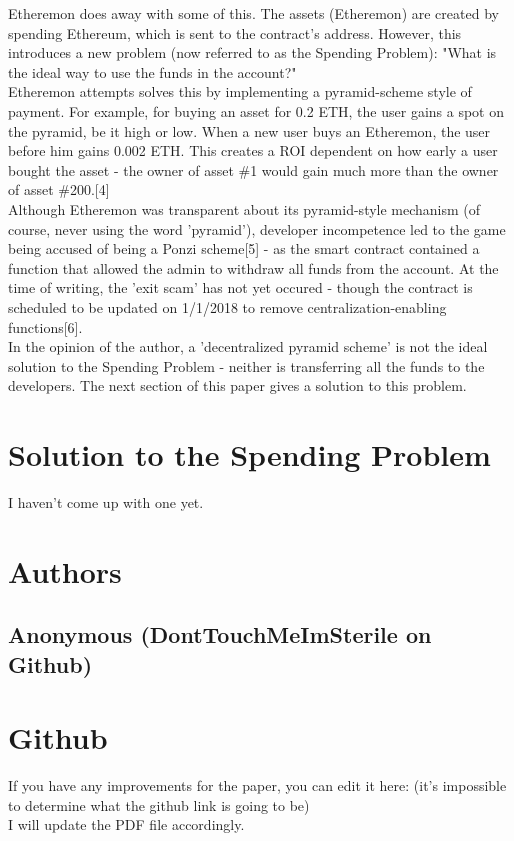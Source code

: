 \documentclass{article}
\begin{document}
Etheremon does away with some of this. The assets (Etheremon) are created by spending Ethereum, which is sent to the contract's address. However, this introduces a new problem (now referred to as the Spending Problem): "What is the ideal way to use the funds in the account?"
\\

Etheremon attempts solves this by implementing a pyramid-scheme style of payment. For example, for buying an asset for 0.2 ETH, the user gains a spot on the pyramid, be it high or low. When a new user buys an Etheremon, the user before him gains 0.002 ETH. This creates a ROI dependent on how early a user bought the asset - the owner of asset \#1 would gain much more than the owner of asset \#200.[4]
\\

Although Etheremon was transparent about its pyramid-style mechanism (of course, never using the word 'pyramid'), developer incompetence led to the game being accused of being a Ponzi scheme[5] - as the smart contract contained a function that allowed the admin to withdraw all funds from the account. At the time of writing, the 'exit scam' has not yet occured - though the contract is scheduled to be updated on 1/1/2018 to remove centralization-enabling functions[6]. 
\\

In the opinion of the author, a 'decentralized pyramid scheme' is not the ideal solution to the Spending Problem - neither is transferring all the funds to the developers. The next section of this paper gives a solution to this problem.
\\

\section{Solution to the Spending Problem}
I haven't come up with one yet. 
\newpage
\section{Authors}
\subsection{Anonymous (DontTouchMeImSterile on Github)}
\section{Github}
If you have any improvements for the paper, you can edit it here: (it's impossible to determine what the github link is going to be)
\\
I will update the PDF file accordingly.
\end{document}
